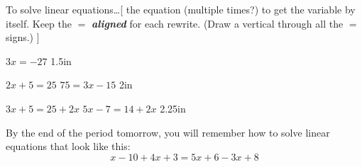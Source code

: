 \begin{myConceptSteps}{To solve linear equations\dots}[%
     the equation (multiple times?) to get the variable by itself.
    Keep the $=$ {\bfseries\itshape aligned} for each rewrite.
    (Draw a vertical  through all the $=$ signs.)
    ]
\end{myConceptSteps}

{
    \centering
    $3x = -27$
}
{1.5in}

\myProblems
{
    \centering 
    $2x + 5 = 25$
}
{
    \centering
    $75 = 3x - 15$
}
{2in}

\myProblems
{
    \centering 
    $3x + 5 = 25 + 2x$
}
{
    \centering
    $5x - 7 = 14 + 2x$
}
{2.25in}

\noindent
By the end of the period tomorrow,
you will remember how to solve linear equations that look like this:
\[
    x - 10 + 4x + 3 = 5x + 6 - 3x +8
\]